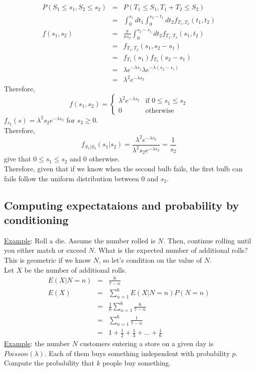     \begin{eqnarray*}
      P(S_1 \le s_1, S_2 \le s_2) 
        & = & P(T_1 \le S_1 , T_1 + T_2 \le S_2)\\
        & = & \int_0^{s_1} dt_1 \int_0^{s_2 - t_1} dt_2 f_{T_1, T_2}(t_1, t_2)\\
      f(s_1, s_2) 
        & = & \frac{\sigma}{\sigma s_2}\int_0^{s_2 - s_1} dt_2 f_{T_1, T_2}(s_1, t_2)\\
        & = & f_{T_1, T_2}(s_1, s_2 - s_1)\\
        & = & f_{T_1}(s_1)f_{T_2}(s_2 - s_1)\\
        & = & \lambda e^{-\lambda s_1} \lambda e^{-\lambda (s_2 - s_1)}\\
        & = & \lambda^2 e^{-\lambda s_2}
    \end{eqnarray*}
    Therefore,
    $$
      f(s_1, s_2) = 
        \begin{cases}
          \lambda^2 e^{-\lambda s_2} & \text{if } 0 \le s_1 \le s_2\\
          0 & \text{otherwise}
        \end{cases}
    $$
    $f_{s_2}(s) = \lambda^2 s_2 e^{-\lambda s_2}$ for $s_2 \ge 0$.\\
    Therefore,
    $$
      f_{S_1| S_2}(s_1 | s_2) = \frac{\lambda^2 e^{-\lambda s_2}}{\lambda^2 s_2 e^{-\lambda s_2}}
         = \frac{1}{s_2}
    $$
    give that $0 \le s_1 \le s_2$ and 0 otherwise.\\
    Therefore, given that if we know when the second bulb fails, the first 
    bulb can fails follow the uniform distribution between $0$ and $s_2$.

  \subsection*{Computing expectataions and probability by conditioning}
    \underline{Example}: Roll a die. Assume the number rolled is $N$.
      Then, continue rolling until you either match or exceed $N$.
      What is the expected number of additional rolls?\\
      This is geometric if we know $N$, so let's condition on the
      value of $N$.\\
      Let $X$ be the number of additional rolls.\\

      \begin{eqnarray*}
        E(X|N = n)
          & = & \frac{6}{7-n}\\
        E(X) 
          & = & \sum_{n = 1}^6 E(X|N = n) P(N = n)\\
          & = & \frac{1}{6}\sum_{n=1}^6 \frac{6}{7-n}\\
          & = & \sum_{n=1}^6 \frac{1}{7-n}\\
          & = & 1 + \frac{1}{2} + \frac{1}{3} + \ldots + \frac{1}{6}
      \end{eqnarray*}
    \underline{Example}: the number $N$ customers entering a store on a given 
      day is $Poisson(\lambda)$. Each of them buys something independent with
      probability $p$.\\
      Compute the probability that $k$ people buy something.\\
